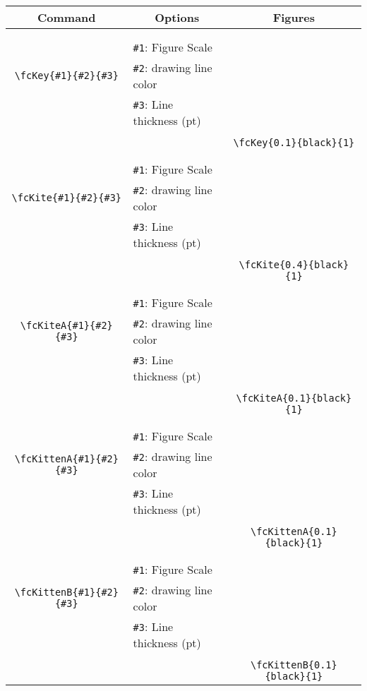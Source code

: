 \documentclass[x11names]{article}
\begin{document}
\begin{table}[H]\centering\begin{tabular}{|c|l|c|}\hline {\bf Command}& \multicolumn{1}{c|}{{\bf Options}} & {\bf Figures}\\  \hline	&&\multirow{5}{*}{\fcKey{0.1}{black}{1}}\\	&&\\	&\verb|#1|: Figure Scale &\\	\verb|\fcKey{#1}{#2}{#3}|&	\verb|#2|: drawing line color &\\	&\verb|#3|: Line thickness (pt) &\\ &&\\&&	\verb|\fcKey{0.1}{black}{1}|\\\hline 	
	&&\multirow{5}{*}{\fcKite{0.4}{black}{1}}\\	&&\\	&\verb|#1|: Figure Scale &\\	\verb|\fcKite{#1}{#2}{#3}|&	\verb|#2|: drawing line color &\\	&\verb|#3|: Line thickness (pt) &\\ &&\\&&	\verb|\fcKite{0.4}{black}{1}|\\\hline 	
	&&\multirow{5}{*}{\fcKiteA{0.1}{black}{1}}\\	&&\\	&\verb|#1|: Figure Scale &\\	\verb|\fcKiteA{#1}{#2}{#3}|&	\verb|#2|: drawing line color &\\	&\verb|#3|: Line thickness (pt) &\\ &&\\&&	\verb|\fcKiteA{0.1}{black}{1}|\\\hline 	
	&&\multirow{5}{*}{\fcKittenA{0.1}{black}{1}}\\	&&\\	&\verb|#1|: Figure Scale &\\	\verb|\fcKittenA{#1}{#2}{#3}|&	\verb|#2|: drawing line color &\\	&\verb|#3|: Line thickness (pt) &\\ &&\\&&	\verb|\fcKittenA{0.1}{black}{1}|\\\hline 	
	&&\multirow{5}{*}{\fcKittenB{0.1}{black}{1}}\\	&&\\	&\verb|#1|: Figure Scale &\\	\verb|\fcKittenB{#1}{#2}{#3}|&	\verb|#2|: drawing line color &\\	&\verb|#3|: Line thickness (pt) &\\ &&\\&&	\verb|\fcKittenB{0.1}{black}{1}|\\\hline 	

\end{tabular}
\end{table}
\end{document}

